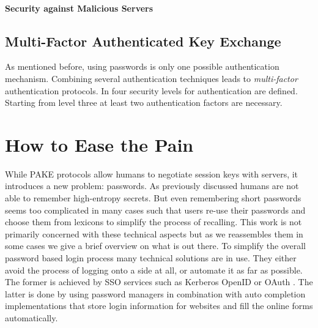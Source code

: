 \paragraph{Security against Malicious Servers}

\subsection{Multi-Factor Authenticated Key Exchange}
As mentioned before, using passwords is only one possible authentication mechanism.
Combining several authentication techniques leads to \emph{multi-factor} authentication protocols.
In \cite{Burr11} four security levels for authentication are defined.
Starting from level three at least two authentication factors are necessary.


\section{How to Ease the Pain}
While \ac{PAKE} protocols allow humans to negotiate session keys with servers, it introduces a new problem: passwords.
As previously discussed humans are not able to remember high-entropy secrets.
But even remembering short passwords seems too complicated in many cases such that users re-use their passwords and choose them from lexicons to simplify the process of recalling.
This work is not primarily concerned with these technical aspects but as we reassembles them in some cases we give a brief overview on what is out there.
To simplify the overall password based login process many technical solutions are in use.
They either avoid the process of logging onto a side at all, or automate it as far as possible.
The former is achieved by \ac{SSO} services such as Kerberos \cite{rfc4120} OpenID \cite{OpenID} or OAuth \cite{rfc6749}.
The latter is done by using password managers in combination with auto completion implementations that store login information for websites and fill the online forms automatically.


